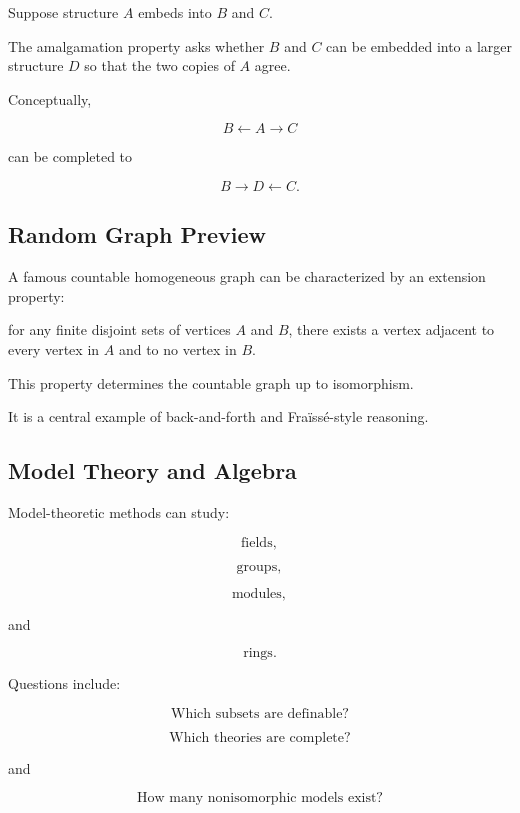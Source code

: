 Suppose structure \(A\) embeds into \(B\) and \(C\).

The amalgamation property asks whether \(B\) and \(C\) can be embedded into
a larger structure \(D\) so that the two copies of \(A\) agree.

Conceptually,

\[
\boxed{
B
\leftarrow
A
\rightarrow
C
}
\]

can be completed to

\[
\boxed{
B
\rightarrow
D
\leftarrow
C.
}
\]

\subsection{Random Graph Preview}
\label{subsec:random-graph-model-theory}

A famous countable homogeneous graph can be characterized by an extension
property:

for any finite disjoint sets of vertices \(A\) and \(B\), there exists a
vertex adjacent to every vertex in \(A\) and to no vertex in \(B\).

This property determines the countable graph up to isomorphism.

It is a central example of back-and-forth and Fraïssé-style reasoning.

\subsection{Model Theory and Algebra}
\label{subsec:model-theory-algebra}

Model-theoretic methods can study:

\[
\boxed{
\text{fields},
}
\]

\[
\boxed{
\text{groups},
}
\]

\[
\boxed{
\text{modules},
}
\]

and

\[
\boxed{
\text{rings}.
}
\]

Questions include:

\[
\boxed{
\text{Which subsets are definable?}
}
\]

\[
\boxed{
\text{Which theories are complete?}
}
\]

and

\[
\boxed{
\text{How many nonisomorphic models exist?}
}
\]

